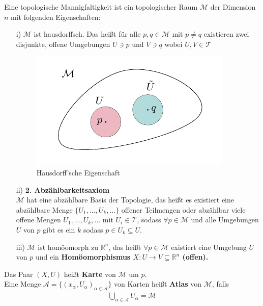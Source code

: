 \begin{defs}
Eine topologische Mannigfaltigkeit ist ein topologischer Raum $\mathcal{M}$ der Dimension $n$ mit folgenden Eigenschaften:
\begin{enumerate}
	\item[i)] $\mathcal{M}$ ist hausdorffsch. Das heißt für alle $p, q \in \mathcal{M}$ mit $p \neq q $ existieren zwei disjunkte, offene Umgebungen $U \ni p$ und $V \ni q$ wobei $U, V \in \mathcal{T}$
\begin{figure}[H]
\centering
\includegraphics[width=0.4\linewidth]{figures/tikz/hausdorff.pdf}
\caption{Hausdorff'sche Eigenschaft}
\label{img:hausdorff}
\end{figure} 	
	\item[ii)] \textbf{2. Abzählbarkeitsaxiom}  \\
	$\mathcal{M}$ hat eine abzählbare Basis der Topologie, das heißt es existiert eine abzählbare Menge $\{U_1, \dots, U_k, \dots\}$ 
	offener Teilmengen oder abzählbar viele offene Mengen $U_1, \dots, U_k, \dots$ mit $U_i \in \mathcal{T}$, 
	sodass $\forall p \in \mathcal{M}$ und alle Umgebungen $U$ von $p$ gibt es ein $k$ sodass $p \in U_k \subseteq U$.
	\item [iii)] $\mathcal{M}$ ist homöomorph zu $\mathbb{R}^n$, das heißt $\forall p \in \mathcal{M}$ existiert eine Umgebung $U$ von $p$ und ein \bfseries Homöomorphismus \normalfont $X: U \rightarrow V \subseteq \mathbb{R}^n$ (offen).
\end{enumerate} 
\end{defs}
\begin{minipage}[H]{.8\textwidth}
\begin{defs}
	Das Paar $(X, U)$ heißt \textbf{Karte} von $\mathcal{M}$ um $p$. \\
	Eine Menge $\mathcal{A} = \{(x_{\alpha},U_{\alpha})_{\alpha \in \mathcal{A}}\}$ von Karten heißt \textbf{Atlas} von $\mathcal{M}$, falls \\
	\begin{align}
	\bigcup\limits_{\alpha \in \mathcal{A}} U_\alpha = \mathcal{M}
	\end{align}
\end{defs}
\end{minipage}
